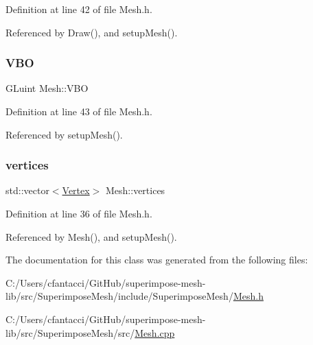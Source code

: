 Definition at line 42 of file Mesh.\+h.



Referenced by Draw(), and setup\+Mesh().

\mbox{\label{classMesh_a0d28b2c6fee628a13f43cae3f858569b}} 
\subsubsection{\texorpdfstring{V\+BO}{VBO}}
{\footnotesize\ttfamily G\+Luint Mesh\+::\+V\+BO\hspace{0.3cm}{\ttfamily [private]}}



Definition at line 43 of file Mesh.\+h.



Referenced by setup\+Mesh().

\mbox{\label{classMesh_a6465a888c97232a39e12aad008c969c3}} 
\subsubsection{\texorpdfstring{vertices}{vertices}}
{\footnotesize\ttfamily std\+::vector$<$\mbox{\hyperlink{structVertex}{Vertex}}$>$ Mesh\+::vertices}



Definition at line 36 of file Mesh.\+h.



Referenced by Mesh(), and setup\+Mesh().



The documentation for this class was generated from the following files\+:\begin{DoxyCompactItemize}
\item 
C\+:/\+Users/cfantacci/\+Git\+Hub/superimpose-\/mesh-\/lib/src/\+Superimpose\+Mesh/include/\+Superimpose\+Mesh/\mbox{\hyperlink{Mesh_8h}{Mesh.\+h}}\item 
C\+:/\+Users/cfantacci/\+Git\+Hub/superimpose-\/mesh-\/lib/src/\+Superimpose\+Mesh/src/\mbox{\hyperlink{Mesh_8cpp}{Mesh.\+cpp}}\end{DoxyCompactItemize}
